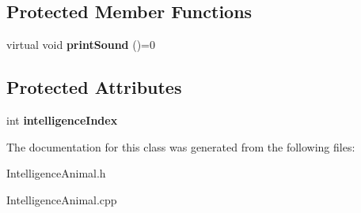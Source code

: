 \subsection*{Protected Member Functions}
\begin{DoxyCompactItemize}
\item 
\mbox{\label{class_intelligence_animal_a40e0aae3c7b4c4aa4c7e75891243996b}} 
virtual void {\bfseries print\+Sound} ()=0
\end{DoxyCompactItemize}
\subsection*{Protected Attributes}
\begin{DoxyCompactItemize}
\item 
\mbox{\label{class_intelligence_animal_a6e3849ba9edcfe0c616feb0abce90bd6}} 
int {\bfseries intelligence\+Index}
\end{DoxyCompactItemize}


The documentation for this class was generated from the following files\+:\begin{DoxyCompactItemize}
\item 
Intelligence\+Animal.\+h\item 
Intelligence\+Animal.\+cpp\end{DoxyCompactItemize}
